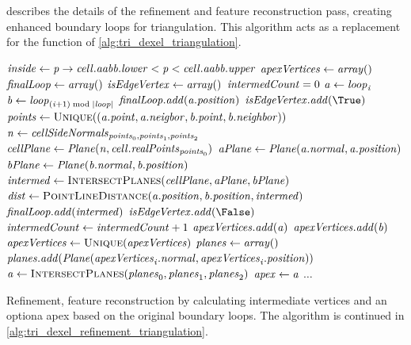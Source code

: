  describes the details of the refinement and feature reconstruction pass, creating enhanced boundary loops for triangulation.
This algorithm acts as a replacement for the  function of \cref{alg:tri_dexel_triangulation}.
%
\begin{algorithm}
	\centering
	\begin{algorithmic}[1]
			\State $\mathit{inside} \gets \mathit{p} \rightarrow \mathit{cell}.\mathit{aabb}.\mathit{lower} < \mathit{p} < \mathit{cell}.\mathit{aabb}.\mathit{upper}$
			\State $\mathit{apexVertices} \gets \mathit{array}()$
			\State $\mathit{finalLoop} \gets \mathit{array}()$
			\State $\mathit{isEdgeVertex} \gets \mathit{array}()$
			\State $\mathit{intermedCount} = 0$
				\State $\mathit{a} \gets \mathit{loop}_{\mathit{i}}$
				\State $\mathit{b} \gets \mathit{loop}_{(\mathit{i} + 1) \bmod |\mathit{loop}|}$
				\State $\mathit{finalLoop}.\mathit{add}(\mathit{a}.\mathit{position})$
				\State $\var{isEdgeVertex}.\var{add}(\True)$
				\State $\var{points} \gets \Call{Unique}{(\var{a}.\var{point}, \var{a}.\var{neigbor}, \var{b}.\var{point}, \var{b}.\var{neighbor})}$
				\State $\mathit{n} \gets \mathit{cellSideNormals}_{\mathit{points}_0, \mathit{points}_1, \mathit{points}_2}$
				\State $\mathit{cellPlane} \gets \mathit{Plane}(\mathit{n}, \mathit{cell}.\mathit{realPoints}_{\mathit{points}_0})$
				\State $\mathit{aPlane} \gets \mathit{Plane}(\mathit{a}.\mathit{normal}, \mathit{a}.\mathit{position})$
				\State $\mathit{bPlane} \gets \mathit{Plane}(\mathit{b}.\mathit{normal}, \mathit{b}.\mathit{position})$
				\State $\var{intermed} \gets \Call{IntersectPlanes}{\var{cellPlane}, \var{aPlane}, \var{bPlane}}$
					\State $\var{dist} \gets \Call{PointLineDistance}{\var{a}.\var{position}, \var{b}.\var{position}, \var{intermed}}$
						\State $\mathit{finalLoop}.\mathit{add}(\mathit{intermed})$
						\State $\var{isEdgeVertex}.\var{add}(\False)$
						\State $\mathit{intermedCount} \gets \mathit{intermedCount} + 1$
						\State $\mathit{apexVertices}.\mathit{add}(\mathit{a})$
						\State $\mathit{apexVertices}.\mathit{add}(\mathit{b})$
					\EndIf
				\EndIf
			\EndFor
				\State $\var{apexVertices} \gets \Call{Unique}{\var{apexVertices}}$
				\State $\mathit{planes} \gets \mathit{array}()$
					\State $\mathit{planes}.\mathit{add}(\mathit{Plane}(\mathit{apexVertices}_{\mathit{i}}.\mathit{normal}, \mathit{apexVertices}_{\mathit{i}}.\mathit{position}))$
				\EndFor
				\State $\var{a} \gets \Call{IntersectPlanes}{\var{planes}_0, \var{planes}_1, \var{planes}_2}$
					\State $\mathit{apex} \gets \mathit{a}$
				\EndIf
			\EndIf
			\State $\dots$
	\end{algorithmic}
	\caption{
		Refinement, feature reconstruction by calculating intermediate vertices and an optiona apex based on the original boundary loops.
		The algorithm is continued in \cref{alg:tri_dexel_refinement_triangulation}.
	}
	\label{alg:tri_dexel_refinement}
\end{algorithm}
